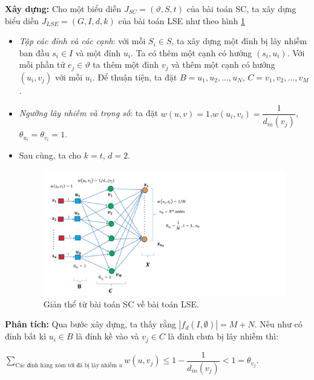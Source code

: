  	{\bfseries Xây dựng:} Cho một biểu diễn $J_{SC} = (\vartheta, S, t)$ của bài toán SC, ta xây dựng biểu diễn $J_{LSE} = (G, I, d, k)$ của bài toán LSE như theo hình \ref{refhinh3_3}
 	\begin {itemize}
 	\item {\itshape Tập các đỉnh và các cạnh}: với mỗi $S_{i} \in S$, ta xây dựng một đỉnh bị lây nhiễm ban đầu $s_{i} \in I$ và một đỉnh $u_{i}$. Ta có thêm một cạnh có hướng $(s_{i}, u_{i})$. Với mỗi phần tử $e_{j} \in \vartheta$ ta thêm một đỉnh $v_{j}$ và thêm một cạnh có hướng $(u_{i},v_{j})$ với mỗi $u_{i}$. Để thuận tiện, ta đặt $B = {u_{1}, u_{2}, ... , u_{N}}$, $C = {v_{1}, v_{2}, ... , v_{M}}$.
 	
 	\item {\itshape Ngưỡng lây nhiễm và trọng số}: ta đặt $w(u,v) = 1$,\linebreak $w(u_{i}, v_{i}) = \dfrac{1}{d_{in}(v_{j})}$, $\theta_{u_{i}} = \theta_{v_{i}} = 1$.
 	
 	\item Sau cùng, ta cho $k = t$, $d = 2$. 		
 	
 	\begin{center}
 		\begin{figure}[!htp]
 			\begin{center}
 				\includegraphics [scale=.5]{picture/Hinh3_3}
 			\end{center}
 			\caption{Giản thể từ bài toán SC về bài toán LSE.}
 			\label{refhinh3_3}
 		\end{figure}
 	\end{center}
 	\end {itemize}
 	{\bfseries Phân tích:} Qua bước xây dựng, ta thấy rằng $| f_{d}(I,\emptyset) | = M + N$. Nếu như có đỉnh bất kì $u_{i} \in B$ là đỉnh kề vào và $v_{j} \in C$ là đỉnh chưa bị lây nhiễm thì: 
 	\begin{center}
 		$\sum_{\text{Các đỉnh hàng xóm tới đã bị lây nhiễm $u$}} w(u, v_{j}) \leq 1 - \dfrac{1}{d_{in}(v_{j})} < 1 = \theta_{v_{j}}$.
 	\end{center}
 	
